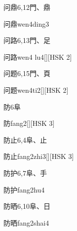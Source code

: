 \begin{entry}{问鼎}{6,12}{⾨、⿍}
  \begin{phonetics}{问鼎}{wen4ding3}
  \end{phonetics}
\end{entry}

\begin{entry}{问路}{6,13}{⾨、⾜}
  \begin{phonetics}{问路}{wen4 lu4}[][HSK 2]
  \end{phonetics}
\end{entry}

\begin{entry}{问题}{6,15}{⾨、⾴}
  \begin{phonetics}{问题}{wen4ti2}[][HSK 2]
  \end{phonetics}
\end{entry}

\begin{entry}{防}{6}{⾩}
  \begin{phonetics}{防}{fang2}[][HSK 3]
  \end{phonetics}
\end{entry}

\begin{entry}{防止}{6,4}{⾩、⽌}
  \begin{phonetics}{防止}{fang2zhi3}[][HSK 3]
  \end{phonetics}
\end{entry}

\begin{entry}{防护}{6,7}{⾩、⼿}
  \begin{phonetics}{防护}{fang2hu4}
  \end{phonetics}
\end{entry}

\begin{entry}{防晒}{6,10}{⾩、⽇}
  \begin{phonetics}{防晒}{fang2shai4}
  \end{phonetics}
\end{entry}


